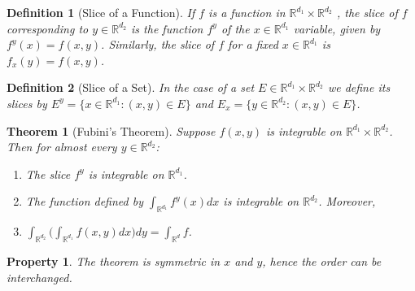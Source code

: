 \documentclass{report}
\theoremstyle{upthm}
\newtheorem{thm}{Theorem}
\newtheorem{defn}{Definition}
\newtheorem{property}{Property}
\newcommand{\reals}{\mathbb{R}}
\newcommand{\set}[1]{\big\lbrace #1 \big\rbrace}
\begin{document}
\begin{defn}[Slice of a Function]
	If $f$ is a function in	$\reals^{d_1} \times \reals^{d_2}$ , the slice of $f$ corresponding to $y \in \reals^{d_2}$ is the function $f^y$ of the $x \in \reals^{d_1}$ variable, given by $f^y(x) = f(x, y)$. Similarly, the slice of $f$ for a fixed $x \in \reals^{d_1}$ is $f_x(y) = f(x, y)$.
\end{defn}

\begin{defn}[Slice of a Set]
	In the case of a set $E \in \reals^{d_1} \times \reals^{d_2}$ we define its slices by
	$E^y = \set{x \in \reals^{d_1} : (x, y) \in E}$ and $E_x = \set{y \in \reals^{d_2} : (x, y) \in E}$.
\end{defn}

\begin{thm}[Fubini's Theorem]
	Suppose $f(x, y)$ is integrable on $\reals^{d_1} \times \reals^{d_2}$. Then for almost every $y \in \reals^{d_2}$:
	\begin{enumerate}
		\item The slice $f^y$ is integrable on $\reals^{d_1}$.
		\item The function defined by $\int_{\reals^{d_1}} f^y(x) dx$ is integrable on $\reals^{d_2}$. Moreover,
		\item $\int_{\reals^{d_2}} \big( \int_{\reals^{d_1}} f(x, y) dx \big) dy = \int_{\reals^d} f $.
	\end{enumerate}
\end{thm}

\begin{property}
	The theorem is symmetric in $x$ and $y$, hence the order can be interchanged.
\end{property}
\end{document}
